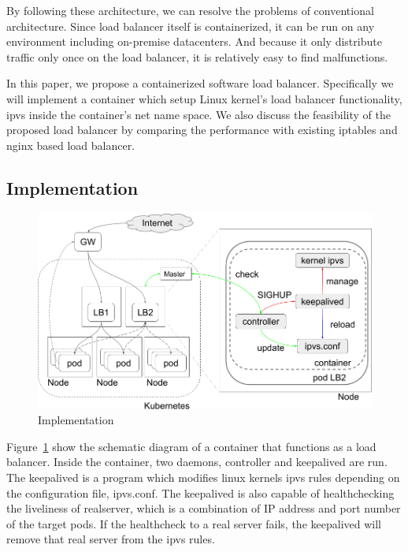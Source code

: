 By following these architecture, we can resolve the problems of conventional architecture.
Since load balancer itself is containerized, it can be run on any environment including on-premise datacenters.
And because it only distribute traffic only once on the load balancer, it is relatively easy to find malfunctions.

In this paper, we propose a containerized software load balancer. 
Specifically we will implement a container which setup Linux kernel's load balancer functionality, 
ipvs inside the container's net name space.
We also discuss the feasibility of the proposed load balancer by comparing the performance with existing iptables and nginx based load balancer. 


\subsection{Implementation}\label{Implementation}

\begin{figure}
\includegraphics[width=\columnwidth]{Figs/ipvs-ingress-schem}
\caption{Implementation}
\label{fig:ipvs-ingress-schem}
\end{figure}

Figure~\ref{fig:ipvs-ingress-schem} show the schematic diagram of a container that functions as a load balancer.
Inside the container, two daemons, controller and keepalived are run.
The keepalived is a program which modifies linux kernels ipvs rules depending on the configuration file, ipvs.conf.
The keepalived is also capable of healthchecking the liveliness of realserver, 
which is a combination of IP address and port number of the target pods. 
If the healthcheck to a real server fails, the keepalived will remove that real server from the ipvs rules.

